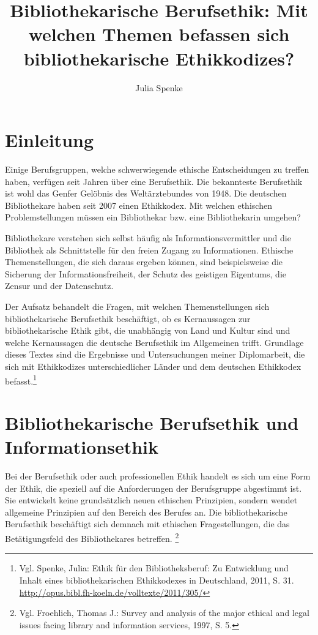 \documentclass[output=paper]{langscibook}
\title{Bibliothekarische Berufsethik: Mit welchen Themen befassen sich bibliothekarische Ethikkodizes?}
\author{Julia Spenke}
\begin{document}
\maketitle

\hypertarget{einleitung}{%
\section*{Einleitung}\label{einleitung}}

Einige Berufsgruppen, welche schwerwiegende ethische Entscheidungen zu
treffen haben, verfügen seit Jahren über eine Berufsethik. Die
bekannteste Berufsethik ist wohl das Genfer Gelöbnis des Weltärztebundes
von 1948. Die deutschen Bibliothekare haben seit 2007 einen Ethikkodex.
Mit welchen ethischen Problemstellungen müssen ein Bibliothekar bzw.
eine Bibliothekarin umgehen?

Bibliothekare verstehen sich selbst häufig als Informationsvermittler
und die Bibliothek als Schnittstelle für den freien Zugang zu
Informationen. Ethische Themenstellungen, die sich daraus ergeben
können, sind beispielsweise die Sicherung der Informationsfreiheit, der
Schutz des geistigen Eigentums, die Zensur und der Datenschutz.

Der Aufsatz behandelt die Fragen, mit welchen Themenstellungen sich
bibliothekarische Berufsethik beschäftigt, ob es Kernaussagen zur
bibliothekarische Ethik gibt, die unabhängig von Land und Kultur sind
und welche Kernaussagen die deutsche Berufsethik im Allgemeinen trifft.
Grundlage dieses Textes sind die Ergebnisse und Untersuchungen meiner
Diplomarbeit, die sich mit Ethikkodizes unterschiedlicher Länder und dem
deutschen Ethikkodex befasst.\footnote{Vgl. Spenke, Julia: Ethik für den
  Bibliotheksberuf: Zu Entwicklung und Inhalt eines bibliothekarischen
  Ethikkodexes in Deutschland, 2011, S. 31.
  \url{http://opus.bibl.fh-koeln.de/volltexte/2011/305/}}

\hypertarget{bibliothekarische-berufsethik-und-informationsethik}{%
\section*{Bibliothekarische Berufsethik und
Informationsethik}\label{bibliothekarische-berufsethik-und-informationsethik}}

Bei der Berufsethik oder auch professionellen Ethik handelt es sich um
eine Form der Ethik, die speziell auf die Anforderungen der Berufsgruppe
abgestimmt ist. Sie entwickelt keine grundsätzlich neuen ethischen
Prinzipien, sondern wendet allgemeine Prinzipien auf den Bereich des
Berufes an. Die bibliothekarische Berufsethik beschäftigt sich demnach
mit ethischen Fragestellungen, die das Betätigungsfeld des
Bibliothekares betreffen. \footnote{Vgl. Froehlich, Thomas J.: Survey
  and analysis of the major ethical and legal issues facing library and
  information services, 1997, S. 5.}
\end{document}
